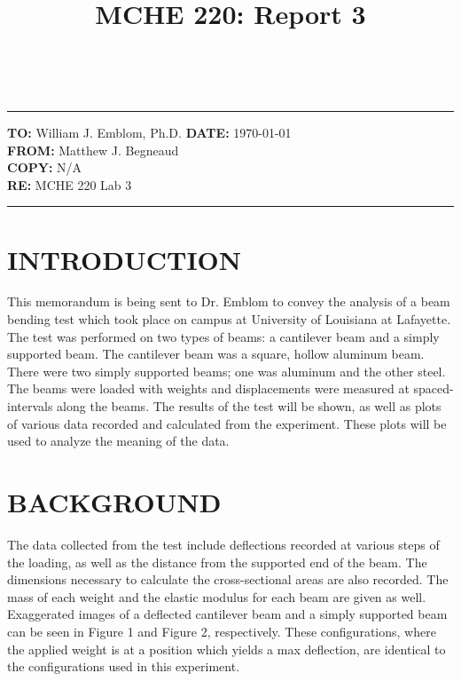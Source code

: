 \documentclass[12pt]{article}
\title{MCHE 220: Report 3}
\begin{document}
\raggedright     %
\fancyhf{} 	
	\renewcommand{\headrulewidth}{0pt}
  	\pagestyle{plain}
    
\captionsetup[table]{labelsep=space}

\begin{flushleft}
\hrulefill\\\hrule height 1pt
\vspace{5pt}
\textbf{TO: }William J. Emblom, Ph.D.  \hfill   \textbf{DATE: }\today                
\bigskip\\
\textbf{FROM: }Matthew J. Begneaud
\bigskip\\
\textbf{COPY: }N/A
\bigskip\\
\textbf{RE: }MCHE 220 Lab 3
\vspace{-10pt}
\end{flushleft}
\hrulefill \hrule height 1pt


\section*{\fontsize{12}{12}\selectfont INTRODUCTION}
This memorandum is being sent to Dr. Emblom to convey the analysis of a beam bending test which took place on campus at University of Louisiana at Lafayette. The test was performed on two types of beams: a cantilever beam and a simply supported beam. The cantilever beam was a square, hollow aluminum beam. There were two simply supported beams; one was aluminum and the other steel. The beams were loaded with weights and displacements were measured at spaced-intervals along the beams. The results of the test will be shown, as well as plots of various data recorded and calculated from the experiment. These plots will be used to analyze the meaning of the data.
\bigskip


\section*{\fontsize{12}{12}\selectfont BACKGROUND}
The data collected from the test include deflections recorded at various steps of the loading, as well as the distance from the supported end of the beam. The dimensions necessary to calculate the cross-sectional areas are also recorded. The mass of each weight and the elastic modulus for each beam are given as well.
Exaggerated images of a deflected cantilever beam and a simply supported beam can be seen in Figure 1 and Figure 2, respectively. These configurations, where the applied weight is at a position which yields a max deflection, are identical to the configurations used in this experiment.
\bigskip
\end{document}
